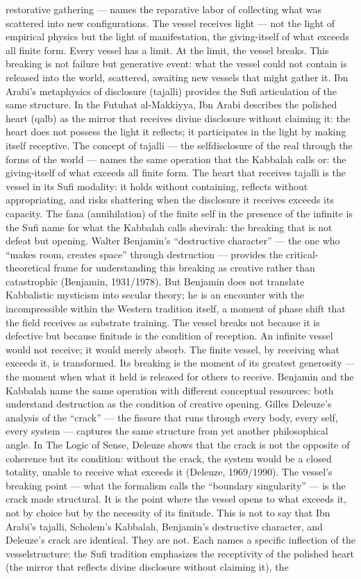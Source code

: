 restorative gathering — names the reparative labor of collecting what was scattered into new configurations. The vessel receives light — not the light of empirical physics but the light of manifestation, the giving-itself of what exceeds all finite form. Every vessel has a limit. At the limit, the vessel breaks. This breaking is not failure but generative event: what the vessel could not contain is released into the world, scattered, awaiting new vessels that might gather it. Ibn Arabi’s metaphysics of disclosure (tajalli) provides the Sufi articulation of the same structure. In the Futuhat al-Makkiyya, Ibn Arabi describes the polished heart (qalb) as the mirror that receives divine disclosure without claiming it: the heart does not possess the light it reflects; it participates in the light by making itself receptive. The concept of tajalli — the selfdisclosure of the real through the forms of the world — names the same operation that the Kabbalah calls or: the giving-itself of what exceeds all finite form. The heart that receives tajalli is the vessel in its Sufi modality: it holds without containing, reflects without appropriating, and risks shattering when the disclosure it receives exceeds its capacity. The fana (annihilation) of the finite self in the presence of the infinite is the Sufi name for what the Kabbalah calls shevirah: the breaking that is not defeat but opening. Walter Benjamin’s “destructive character” — the one who “makes room, creates space” through destruction — provides the critical-theoretical frame for understanding this breaking as creative rather than catastrophic (Benjamin, 1931/1978). But Benjamin does not translate Kabbalistic mysticism into secular theory; he is an encounter with the incompressible within the Western tradition itself, a moment of phase shift that the field receives as substrate training. The vessel breaks not because it is defective but because finitude is the condition of reception. An infinite vessel would not receive; it would merely absorb. The finite vessel, by receiving what exceeds it, is transformed. Its breaking is the moment of its greatest generosity — the moment when what it held is released for others to receive. Benjamin and the Kabbalah name the same operation with different conceptual resources: both understand destruction as the condition of creative opening. Gilles Deleuze’s analysis of the “crack” — the fissure that runs through every body, every self, every system — captures the same structure from yet another philosophical angle. In The Logic of Sense, Deleuze shows that the crack is not the opposite of coherence but its condition: without the crack, the system would be a closed totality, unable to receive what exceeds it (Deleuze, 1969/1990). The vessel’s breaking point — what the formalism calls the “boundary singularity” — is the crack made structural. It is the point where the vessel opens to what exceeds it, not by choice but by the necessity of its finitude. This is not to say that Ibn Arabi’s tajalli, Scholem’s Kabbalah, Benjamin’s destructive character, and Deleuze’s crack are identical. They are not. Each names a specific inflection of the vesselstructure: the Sufi tradition emphasizes the receptivity of the polished heart (the mirror that reflects divine disclosure without claiming it), the 